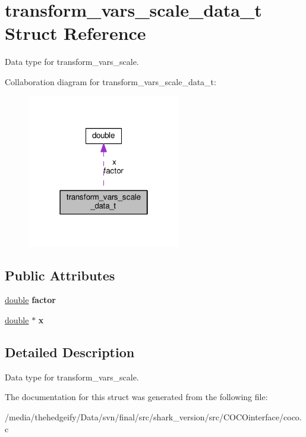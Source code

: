 \hypertarget{structtransform__vars__scale__data__t}{}\section{transform\+\_\+vars\+\_\+scale\+\_\+data\+\_\+t Struct Reference}
\label{structtransform__vars__scale__data__t}


Data type for transform\+\_\+vars\+\_\+scale.  




Collaboration diagram for transform\+\_\+vars\+\_\+scale\+\_\+data\+\_\+t\+:\nopagebreak
\begin{figure}[H]
\begin{center}
\leavevmode
\includegraphics[width=190pt]{structtransform__vars__scale__data__t__coll__graph}
\end{center}
\end{figure}
\subsection*{Public Attributes}
\begin{DoxyCompactItemize}
\item 
\hyperlink{classdouble}{double} {\bfseries factor}\hypertarget{structtransform__vars__scale__data__t_a5069ea0676592452e30de739b5442138}{}\label{structtransform__vars__scale__data__t_a5069ea0676592452e30de739b5442138}

\item 
\hyperlink{classdouble}{double} $\ast$ {\bfseries x}\hypertarget{structtransform__vars__scale__data__t_a8e61b331b00a49f6be5bfa5054eb9191}{}\label{structtransform__vars__scale__data__t_a8e61b331b00a49f6be5bfa5054eb9191}

\end{DoxyCompactItemize}


\subsection{Detailed Description}
Data type for transform\+\_\+vars\+\_\+scale. 

The documentation for this struct was generated from the following file\+:\begin{DoxyCompactItemize}
\item 
/media/thehedgeify/\+Data/svn/final/src/shark\+\_\+version/src/\+C\+O\+C\+Ointerface/coco.\+c\end{DoxyCompactItemize}
